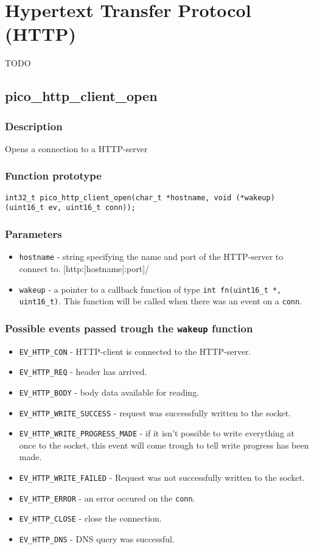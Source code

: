 \section{Hypertext Transfer Protocol (HTTP)}
TODO

\subsection{pico\_http\_client\_open}

\subsubsection*{Description}
Opens a connection to a HTTP-server

\subsubsection*{Function prototype}
\texttt{int32\_t pico\_http\_client\_open(char\_t *hostname, void (*wakeup)(uint16\_t ev, uint16\_t conn));}

\subsubsection*{Parameters}
\begin{itemize}[noitemsep]
\item \texttt{hostname} - string specifying the name and port of the HTTP-server to connect to. [http:]hostname[:port]/
\item \texttt{wakeup} - a pointer to a callback function of type \texttt{int fn(uint16\_t *, uint16\_t)}. This function will be called when there was an event on a \texttt{conn}.
\end{itemize}

\subsubsection*{Possible events passed trough the \texttt{wakeup} function}
\begin{itemize}[noitemsep]
\item \texttt{EV\_HTTP\_CON} - HTTP-client is connected to the HTTP-server.
\item \texttt{EV\_HTTP\_REQ} - header has arrived.
\item \texttt{EV\_HTTP\_BODY} - body data available for reading.
\item \texttt{EV\_HTTP\_WRITE\_SUCCESS} - request was successfully written to the socket.
\item \texttt{EV\_HTTP\_WRITE\_PROGRESS\_MADE} - if it isn't possible to write everything at once to the socket, this event will come trough to tell write progress has been made.
\item \texttt{EV\_HTTP\_WRITE\_FAILED} - Request was not successfully written to the socket.
\item \texttt{EV\_HTTP\_ERROR} - an error occured on the \texttt{conn}.
\item \texttt{EV\_HTTP\_CLOSE} - close the connection.
\item \texttt{EV\_HTTP\_DNS} - DNS query was successful. 
\end{itemize}
